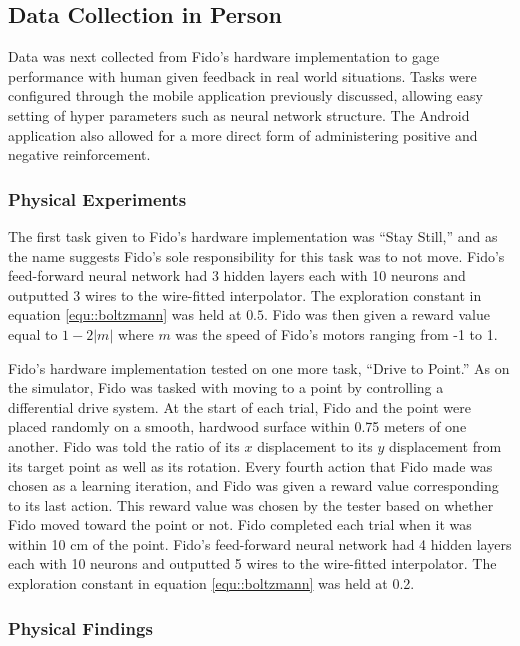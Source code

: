 \subsection{Data Collection in Person}

Data was next collected from Fido's hardware implementation to gage performance with human given feedback in real world situations.
Tasks were configured through the mobile application previously discussed, allowing easy setting of hyper parameters such as neural network structure.
The Android application also allowed for a more direct form of administering positive and negative reinforcement.


\subsubsection{Physical Experiments}

The first task given to Fido's hardware implementation was ``Stay Still,'' and as the name suggests Fido's sole responsibility for this task was to not move.
Fido's feed-forward neural network had 3 hidden layers each with 10 neurons and outputted 3 wires to the wire-fitted interpolator.
The exploration constant in equation \ref{equ::boltzmann} was held at $0.5$.
Fido was then given a reward value equal to $1 - 2|m|$ where $m$ was the speed of Fido's motors ranging from -1 to 1.

Fido's hardware implementation tested on one more task, ``Drive to Point.'' As on the simulator, Fido was tasked with moving to a point by controlling a differential drive system.
 At the start of each trial, Fido and the point were placed randomly on a smooth, hardwood surface within 0.75 meters of one another.
Fido was told the ratio of its $x$ displacement to its $y$ displacement from its target point as well as its rotation.
Every fourth action that Fido made was chosen as a learning iteration, and Fido was given a reward value corresponding to its last action.
This reward value was chosen by the tester based on whether Fido moved toward the point or not.
Fido completed each trial when it was within 10 cm of the point.
Fido's feed-forward neural network had 4 hidden layers each with 10 neurons and outputted 5 wires to the wire-fitted interpolator.
The exploration constant in equation \ref{equ::boltzmann} was held at 0.2.

\subsubsection{Physical Findings}

